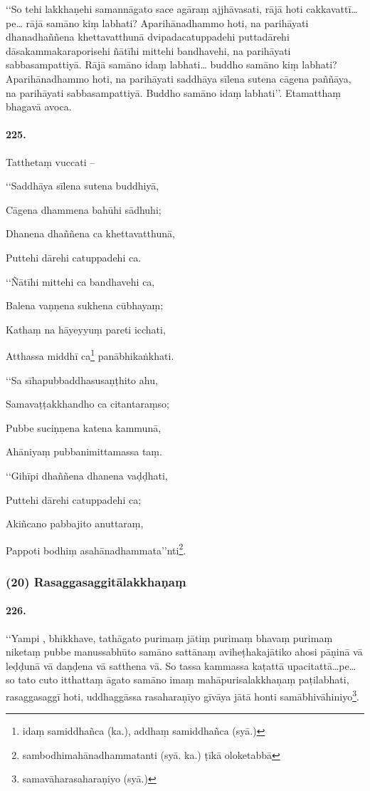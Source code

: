 ‘‘So tehi lakkhaṇehi samannāgato sace agāraṃ ajjhāvasati, rājā hoti cakkavattī…pe… rājā samāno kiṃ labhati? Aparihānadhammo hoti, na parihāyati dhanadhaññena khettavatthunā dvipadacatuppadehi puttadārehi dāsakammakaraporisehi ñātīhi mittehi bandhavehi, na parihāyati sabbasampattiyā. Rājā samāno idaṃ labhati… buddho samāno kiṃ labhati? Aparihānadhammo hoti, na parihāyati saddhāya sīlena sutena cāgena paññāya, na parihāyati sabbasampattiyā. Buddho samāno idaṃ labhati’’. Etamatthaṃ bhagavā avoca.

\paragraph{225.} Tatthetaṃ vuccati –

‘‘Saddhāya sīlena sutena buddhiyā,

Cāgena dhammena bahūhi sādhuhi;

Dhanena dhaññena ca khettavatthunā,

Puttehi dārehi catuppadehi ca.

‘‘Ñātīhi mittehi ca bandhavehi ca,

Balena vaṇṇena sukhena cūbhayaṃ;

Kathaṃ na hāyeyyuṃ pareti icchati,

Atthassa middhī ca\footnote{idaṃ samiddhañca (ka.), addhaṃ samiddhañca (syā.)} panābhikaṅkhati.

‘‘Sa sīhapubbaddhasusaṇṭhito ahu,

Samavaṭṭakkhandho ca citantaraṃso;

Pubbe suciṇṇena katena kammunā,

Ahāniyaṃ pubbanimittamassa taṃ.

‘‘Gihīpi dhaññena dhanena vaḍḍhati,

Puttehi dārehi catuppadehi ca;

Akiñcano pabbajito anuttaraṃ,

Pappoti bodhiṃ asahānadhammata’’nti\footnote{sambodhimahānadhammatanti (syā. ka.) ṭīkā oloketabbā}.

\subsubsection{(20) Rasaggasaggitālakkhaṇaṃ}

\paragraph{226.} ‘‘Yampi , bhikkhave, tathāgato purimaṃ jātiṃ purimaṃ bhavaṃ purimaṃ niketaṃ pubbe manussabhūto samāno sattānaṃ aviheṭhakajātiko ahosi pāṇinā vā leḍḍunā vā daṇḍena vā satthena vā. So tassa kammassa kaṭattā upacitattā…pe… so tato cuto itthattaṃ āgato samāno imaṃ mahāpurisalakkhaṇaṃ paṭilabhati, rasaggasaggī hoti, uddhaggāssa rasaharaṇīyo gīvāya jātā honti samābhivāhiniyo\footnote{samavāharasaharaṇiyo (syā.)}.

